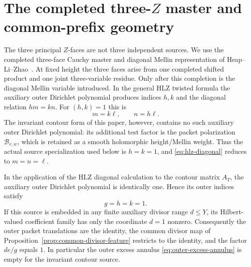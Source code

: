\section{The completed three-\texorpdfstring{$Z$}{Z} master and common-prefix geometry}
\label{sec:threeZ}

The three principal $Z$-faces are not three independent sources. We use the
completed three-face Cauchy master and diagonal Mellin representation of
Heap--Li--Zhao~\cite{HLZ}. At fixed height the three faces arise from one
completed shifted product and one joint three-variable residue. Only after
this completion is the diagonal Mellin variable introduced. In the general
HLZ twisted formula the auxiliary outer Dirichlet polynomial produces indices
$h,k$ and the diagonal relation $hm=kn$. For $(h,k)=1$ this is
\begin{equation}
\boxed{m=k\ell,\qquad n=h\ell.}
\label{eq:hlz-diagonal}
\end{equation}
The invariant contour form of this paper, however, contains no such auxiliary
outer Dirichlet polynomial: its additional test factor is the packet
polarization $\mathcal B_{v,w}$, which is retained as a smooth holomorphic
height/Mellin weight. Thus the actual source specialization used below is
$h=k=1$, and \eqref{eq:hlz-diagonal} reduces to $m=n=\ell$.

\begin{proposition}
\label{prop:trivial-outer-twist}
In the application of the HLZ diagonal calculation to the contour matrix
$A_T$, the auxiliary outer Dirichlet polynomial is identically one. Hence its
outer indices satisfy
\[
\boxed{g=h=k=1.}
\]
If this source is embedded in any finite auxiliary divisor range $d\le Y$, its
Hilbert-valued coefficient family has only the coordinate $d=1$ nonzero.
Consequently the outer packet translations are the identity, the common
divisor map of Proposition~\ref{prop:common-divisor-feature} restricts to the
identity, and the factor $de/g$ equals $1$. In particular the outer excess
annulus \eqref{eq:outer-excess-annulus} is empty for the invariant contour
source.
\end{proposition}

